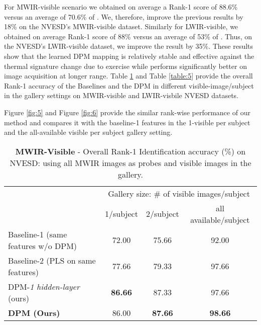 \documentclass[smallextended,natbib]{svjour3}       \usepackage{graphicx}
\begin{document}
For MWIR-visible scenario we obtained on average a Rank-1 score of 88.6\% versus an average of 70.6\% of \cite{hu2015}. We, therefore, improve the previous results by 18\% on the NVESD's MWIR-visible dataset. Similarly for LWIR-visible, we obtained on average Rank-1 score of 88\% versus an average of 53\% of \cite{hu2015}. Thus, on the NVESD's LWIR-visible dataset, we improve the result by 35\%. These results show that the learned DPM mapping is relatively stable and effective against the thermal signature change due to exercise while performs significantly better on image acquisition at longer range. Table \ref{table:6} and Table \ref{table:5} provide the overall Rank-1 accuracy of the Baselines and the DPM in different visible-image/subject in the gallery settings on MWIR-visible and LWIR-visbile NVESD datasets.

Figure \ref{fig:5} and Figure \ref{fig:6} provide the similar rank-wise performance of our method and compares it with the baseline-1 features in the 1-visible per subject and the all-available visible per subject gallery setting.
\begin{table}[t]
\centering
\begin{tabular}{@{}lccc@{}}
\toprule
                                 & \multicolumn{3}{c}{Gallery size: \# of visible images/subject} \\ \cmidrule(l){2-4} 
                                 & 1/subject         & 2/subject        & all available/subject   \\ \midrule
Baseline-1 (same features w/o DPM) & 72.00             & 75.66            & 92.00                   \\
Baseline-2 (PLS on same features) & 77.66             & 79.33            & 97.66                  \\
DPM-\textit{1 hidden-layer} (ours)             & \textbf{86.66}              & 87.33             & 97.66                   
\\
\textbf{DPM  (Ours)}             & 86.00    & \textbf{87.66}   & \textbf{98.66}          \\ \bottomrule
\end{tabular}
\caption{\textbf{MWIR-Visible} - Overall Rank-1 Identification accuracy (\%) on NVESD: using all MWIR images as probes and visible images in the gallery.}
\label{table:6}
\end{table}
\end{document}
